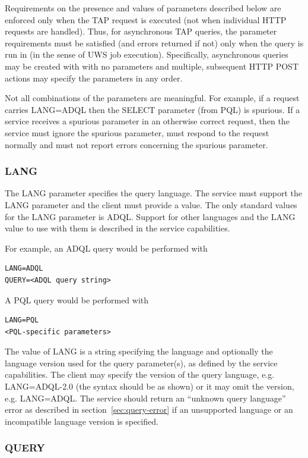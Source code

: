 \documentclass[11pt,letter]{ivoa}
\begin{document}
Requirements on the presence and values of parameters described below are 
enforced only when the TAP request is executed (not when individual HTTP 
requests are handled). Thus, for asynchronous TAP queries, the parameter 
requirements must be satisfied (and errors returned if not) only when the query 
is run in (in the sense of UWS job execution). Specifically, asynchronous 
queries may be created with with no parameters and multiple, subsequent HTTP 
POST actions may specify the parameters in any order.

Not all combinations of the parameters are meaningful. For example, if a request 
carries  LANG=ADQL then the SELECT parameter (from PQL) is spurious. If a 
service receives a spurious parameter in an otherwise correct request, then the 
service must ignore the spurious parameter, must respond to the request normally 
and must not report errors concerning the spurious parameter.

\subsubsection{LANG}
\label{sec:LANG}

The LANG parameter specifies the query language. The service must support the LANG 
parameter and the client must provide a value. The only standard 
values for the LANG parameter is ADQL. Support for other 
languages and the LANG value to use with them is described in the service 
capabilities.

For example, an ADQL query would be performed with
\begin{verbatim}
LANG=ADQL
QUERY=<ADQL query string>
\end{verbatim}
A PQL query would be performed with
\begin{verbatim}
LANG=PQL
<PQL-specific parameters>
\end{verbatim}
The value of LANG is a string specifying the language and optionally the 
language version used for the query parameter(s), as defined by the service 
capabilities.  The client may specify the version of the query language,  e.g. 
LANG=ADQL-2.0 (the syntax should be as shown) or it may omit the version, e.g. 
LANG=ADQL.  The service should return an “unknown query language” error as 
described in section~\ref{sec:query-error} if an unsupported language or an incompatible 
language version is specified.

\subsubsection{QUERY}
\label{sec:QUERY}
\end{document}

